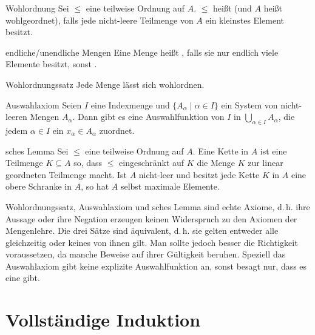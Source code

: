 \begin{Def}{Wohlordnung}
    Sei $\le$ eine teilweise Ordnung auf $A$.
    $\le$ heißt  (und $A$ heißt wohlgeordnet), falls jede
    nicht-leere Teilmenge von $A$ ein kleinstes Element besitzt.
\end{Def}

\begin{Def}{endliche/unendliche Mengen}
    Eine Menge heißt , falls sie nur endlich viele Elemente
    besitzt, sonst .
\end{Def}

\begin{Satz}{Wohlordnungssatz}
    Jede Menge lässt sich wohlordnen.
\end{Satz}

\begin{Satz}{Auswahlaxiom}
    Seien $I$ eine Indexmenge und $\{A_\alpha \;|\; \alpha \in I\}$ ein System
    von nicht-leeren Mengen $A_\alpha$.
    Dann gibt es eine Auswahlfunktion von $I$ in
    $\bigcup_{\alpha \in I} A_\alpha$, die jedem $\alpha \in I$ ein
    $x_\alpha \in A_\alpha$ zuordnet.
\end{Satz}

\begin{Satz}{sches Lemma}
    Sei $\le$ eine teilweise Ordnung auf $A$.
    Eine Kette in $A$ ist eine Teilmenge $K \subseteq A$ so, dass $\le$
    eingeschränkt auf $K$ die Menge $K$ zur linear geordneten Teilmenge macht.
    Ist $A$ nicht-leer und besitzt jede Kette $K$ in $A$ eine obere Schranke
    in $A$, so hat $A$ selbst maximale Elemente.
\end{Satz}

\begin{Bem}
    Wohlordnungssatz, Auswahlaxiom und sches Lemma sind echte
    Axiome, d.\,h. ihre Aussage oder ihre Negation erzeugen keinen Widerspruch
    zu den Axiomen der Mengenlehre.
    Die drei Sätze sind äquivalent, d.\,h. sie gelten entweder alle gleichzeitig
    oder keines von ihnen gilt.
    Man sollte jedoch besser die Richtigkeit voraussetzen, da manche Beweise
    auf ihrer Gültigkeit beruhen.
    Speziell das Auswahlaxiom gibt keine explizite Auswahlfunktion an, sonst
    besagt nur, dass es eine gibt.
\end{Bem}

\section{%
    Vollständige Induktion%
}


